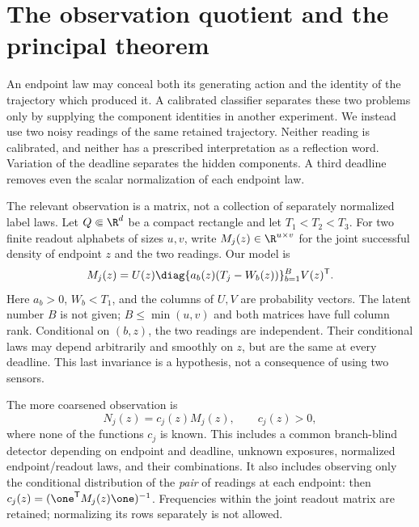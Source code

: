 \section{The observation quotient and the principal theorem}
\label{sec:v81-principal}

An endpoint law may conceal both its generating action and the identity
of the trajectory which produced it.  A calibrated classifier separates
these two problems only by supplying the component identities in another
experiment.  We instead use two noisy readings of the same retained
trajectory.  Neither reading is calibrated, and neither has a prescribed
interpretation as a reflection word.  Variation of the deadline separates
the hidden components.  A third deadline removes even the scalar
normalization of each endpoint law.

The relevant observation is a matrix, not a collection of separately
normalized label laws.  Let $Q\Subset\R^d$ be a compact rectangle and let
$T_1<T_2<T_3$.  For two finite readout alphabets of sizes $u,v$, write
$M_j(z)\in\R^{u\times v}$ for the joint successful density of endpoint
$z$ and the two readings.  Our model is
\begin{equation}\label{eq:v81-model}
 M_j(z)=U(z)\diag\{a_b(z)(T_j-W_b(z))\}_{b=1}^{B}V(z)^{\mathsf T}.
\end{equation}
Here $a_b>0$, $W_b<T_1$, and the columns of $U,V$ are probability
vectors.  The latent number $B$ is not given; $B\le\min(u,v)$ and both
matrices have full column rank.  Conditional on $(b,z)$, the two readings
are independent.  Their conditional laws may depend arbitrarily and
smoothly on $z$, but are the same at every deadline.  This last
invariance is a hypothesis, not a consequence of using two sensors.

The more coarsened observation is
\begin{equation}\label{eq:v81-projective-data}
                         N_j(z)=c_j(z)M_j(z),\qquad c_j(z)>0,
\end{equation}
where none of the functions $c_j$ is known.  This includes a common
branch-blind detector depending on endpoint and deadline, unknown
exposures, normalized endpoint/readout laws, and their combinations.
It also includes observing only the conditional distribution of the
\emph{pair} of readings at each endpoint: then
$c_j(z)=(\one^{\mathsf T}M_j(z)\one)^{-1}$.  Frequencies within the
joint readout matrix are retained; normalizing its rows separately is
not allowed.

